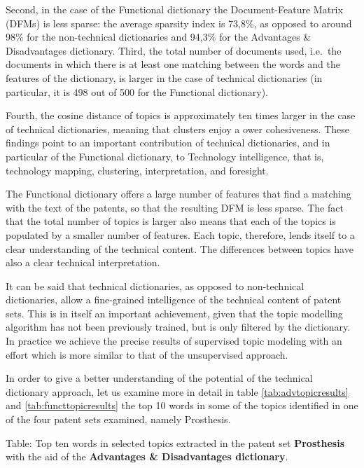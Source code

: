 \documentclass[]{book}
\begin{document}
Second, in the case of the Functional dictionary the Document-Feature
Matrix (DFMs) is less sparse: the average sparsity index is 73,8\%, as
opposed to around 98\% for the non-technical dictionaries and 94,3\% for
the Advantages \& Disadvantages dictionary. Third, the total number of
documents used, i.e.~the documents in which there is at least one
matching between the words and the features of the dictionary, is larger
in the case of technical dictionaries (in particular, it is 498 out of
500 for the Functional dictionary).

Fourth, the cosine distance of topics is approximately ten times larger
in the case of technical dictionaries, meaning that clusters enjoy a
ower cohesiveness. These findings point to an important contribution of
technical dictionaries, and in particular of the Functional dictionary,
to Technology intelligence, that is, technology mapping, clustering,
interpretation, and foresight.

The Functional dictionary offers a large number of features that find a
matching with the text of the patents, so that the resulting DFM is less
sparse. The fact that the total number of topics is larger also means
that each of the topics is populated by a smaller number of features.
Each topic, therefore, lends itself to a clear understanding of the
technical content. The differences between topics have also a clear
technical interpretation.

It can be said that technical dictionaries, as opposed to non-technical
dictionaries, allow a fine-grained intelligence of the technical content
of patent sets. This is in itself an important achievement, given that
the topic modelling algorithm has not been previously trained, but is
only filtered by the dictionary. In practice we achieve the precise
results of supervised topic modeling with an effort which is more
similar to that of the unsupervised approach.

In order to give a better understanding of the potential of the
technical dictionary approach, let us examine more in detail in table
\ref{tab:advtopicresults} and \ref{tab:functtopicresults} the top 10
words in some of the topics identified in one of the four patent sets
examined, namely Prosthesis.

Table: \label{tab:advtopicresults} Top ten words in selected topics
extracted in the patent set \textbf{Prosthesis} with the aid of the
\textbf{Advantages \& Disadvantages dictionary}.
\end{document}
